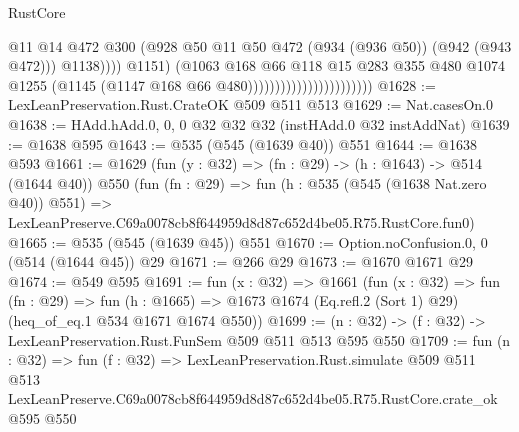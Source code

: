 \begin{lexlean}{RustCore}
\begin{coremodule}
                                                      @11
                                                      @14
                                                      @472
                                                      @300
                                                      (@928
                                                        @50
                                                        @11
                                                        @50
                                                        @472
                                                        (@934 (@936 @50))
                                                        (@942 (@943 @472)))
                                                      @1138))))
                                              @1151)
                                            (@1063
                                              @168
                                              @66
                                              @118
                                              @15
                                              @283
                                              @355
                                              @480
                                              @1074
                                              @1255
                                              (@1145 (@1147 @168 @66 @480)))))))))))))))))))))))
@1628 := LexLeanPreservation.Rust.CrateOK @509 @511 @513
@1629 := Nat.casesOn.{0}
@1638 := HAdd.hAdd.{0, 0, 0} @32 @32 @32 (instHAdd.{0} @32 instAddNat)
@1639 := @1638 @595
@1643 := @535 (@545 (@1639 @40)) @551
@1644 := @1638 @593
@1661 := @1629
    (fun (y : @32) => (fn : @29) -> (h : @1643) -> @514 (@1644 @40))
    @550
    (fun (fn : @29) =>
    fun (h : @535 (@545 (@1638 Nat.zero @40)) @551) =>
    LexLeanPreserve.C69a0078cb8f644959d8d87c652d4be05.R75.RustCore.fun0)
@1665 := @535 (@545 (@1639 @45)) @551
@1670 := Option.noConfusion.{0, 0} (@514 (@1644 @45)) @29
@1671 := @266 @29
@1673 := @1670 @1671 @29
@1674 := @549 @595
@1691 := fun (x : @32) =>
  @1661
    (fun (x : @32) =>
    fun (fn : @29) =>
    fun (h : @1665) => @1673 @1674 (Eq.refl.{2} (Sort 1) @29) (heq_of_eq.{1} @534 @1671 @1674 @550))
@1699 := (n : @32) -> (f : @32) -> LexLeanPreservation.Rust.FunSem @509 @511 @513 @595 @550
@1709 := fun (n : @32) =>
  fun (f : @32) =>
  LexLeanPreservation.Rust.simulate
    @509
    @511
    @513
    LexLeanPreserve.C69a0078cb8f644959d8d87c652d4be05.R75.RustCore.crate_ok
    @595
    @550
\end{coremodule}
\end{lexlean}
